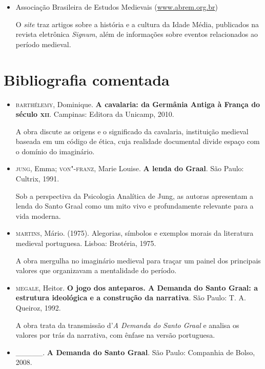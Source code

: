 \documentclass{extarticle}
\begin{document}
\begin{itemize}
\item Associação Brasileira de Estudos Medievais
(\href{http://www.abrem.org.br}{www.abrem.org.br})

  O \emph{site} traz artigos sobre a história e a cultura da Idade
  Média, publicados na revista eletrônica \emph{Signum}, além de
  informações sobre eventos relacionados ao período medieval.
\end{itemize}

\section{Bibliografia comentada}


\begin{itemize}
\item\textsc{barthélemy}, Dominique. \textbf{A cavalaria: da Germânia Antiga à França do século \textsc{xii}}. Campinas: Editora da Unicamp, 2010.

  A obra discute as origens e o significado da cavalaria, instituição
  medieval baseada em um código de ética, cuja realidade documental
  divide espaço com o domínio do imaginário.

\item\textsc{jung}, Emma; \textsc{von"-franz}, Marie Louise. \textbf{A lenda do Graal}. São
Paulo: Cultrix, 1991.

  Sob a perspectiva da Psicologia Analítica de Jung, as autoras
  apresentam a lenda do Santo Graal como um mito vivo e profundamente
  relevante para a vida moderna.

\item\textsc{martins}, Mário. (1975). Alegorias, símbolos e exemplos morais da
literatura medieval portuguesa. Lisboa: Brotéria, 1975.

  A obra mergulha no imaginário medieval para traçar um painel dos
  principais valores que organizavam a mentalidade do período.

\item\textsc{megale}, Heitor. \textbf{O jogo dos anteparos. A Demanda do Santo Graal: a estrutura ideológica e a construção da narrativa}. São Paulo: T. A.
Queiroz, 1992.

  A obra trata da transmissão d'\emph{A Demanda do Santo Graal} e
  analisa os valores por trás da narrativa, com ênfase na versão
  portuguesa.

\item\_\_\_\_\_. \textbf{A Demanda do Santo Graal}. São Paulo: Companhia de
Bolso, 2008.


\end{itemize}
\end{document}
